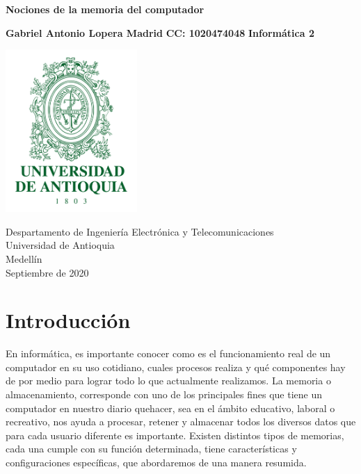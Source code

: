 \documentclass{article}
\begin{document}
\begin{titlepage}
    \begin{center}
        
        
            
        \Huge
        \textbf{Nociones de la memoria del computador}
            
        \vspace{2.4cm}
        \LARGE
            
        \vspace{1.0cm}
        \LARGE
        \centering
        \textbf{Gabriel Antonio Lopera Madrid}\break
        \vspace{2cm}
        \LARGE
        \textbf{CC: 1020474048}\break
        \vspace{4cm}
        \LARGE
        \textbf{Informática 2}\break
        \vspace{1cm}
        \centering
       
        \includegraphics[width=5cm]{udea.png} 
        
        \Large
        Despartamento de Ingeniería Electrónica y Telecomunicaciones\\
        Universidad de Antioquia\\
        Medellín\\
        Septiembre de 2020
            
    \end{center}
\end{titlepage}

\tableofcontents

\section{Introducción}
\noindent En informática, es importante conocer como es el funcionamiento real de un computador en su uso cotidiano, cuales procesos realiza y qué componentes hay de por medio para lograr todo lo que actualmente realizamos. La memoria o almacenamiento, corresponde con uno de los principales fines que tiene un computador en nuestro diario quehacer, sea en el ámbito educativo, laboral o recreativo, nos ayuda a procesar, retener y almacenar todos los diversos datos que para cada usuario diferente es importante. Existen distintos tipos de memorias, cada una cumple con su función determinada, tiene características y configuraciones específicas, que abordaremos de una manera resumida.
\end{document}

